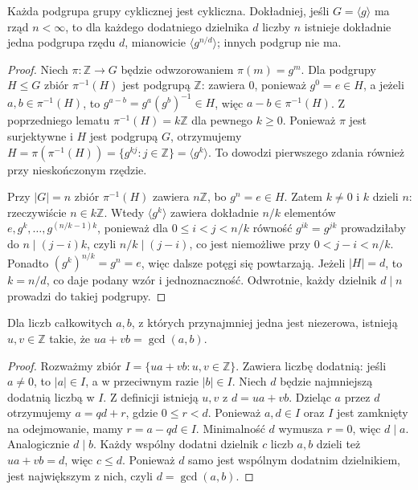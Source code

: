 \begin{twierdzenie}
\label{aa:tw:podgrupy-cykliczne}
Każda podgrupa grupy cyklicznej jest cykliczna.
Dokładniej, jeśli $G=\langle g\rangle$ ma rząd $n<\infty$,
to dla każdego dodatniego dzielnika $d$ liczby $n$ istnieje
dokładnie jedna podgrupa rzędu $d$, mianowicie
$\langle g^{n/d}\rangle$; innych podgrup nie ma.
\end{twierdzenie}
\begin{proof}
Niech $\pi:\mathbb Z\to G$ będzie odwzorowaniem
$\pi(m)=g^m$. Dla podgrupy $H\le G$ zbiór
$\pi^{-1}(H)$ jest podgrupą $\mathbb Z$:
zawiera $0$, ponieważ $g^0=e\in H$, a jeżeli
$a,b\in\pi^{-1}(H)$, to $g^{a-b}=g^a(g^b)^{-1}\in H$,
więc $a-b\in\pi^{-1}(H)$.
Z poprzedniego lematu $\pi^{-1}(H)=k\mathbb Z$ dla pewnego $k\ge0$.
Ponieważ $\pi$ jest surjektywne i $H$ jest podgrupą $G$,
otrzymujemy $H=\pi(\pi^{-1}(H))
=\{g^{kj}:j\in\mathbb Z\}=\langle g^k\rangle$.
To dowodzi pierwszego zdania również przy nieskończonym rzędzie.

Przy $|G|=n$ zbiór $\pi^{-1}(H)$ zawiera $n\mathbb Z$,
bo $g^n=e\in H$. Zatem $k\ne0$ i $k$ dzieli $n$:
rzeczywiście $n\in k\mathbb Z$.
Wtedy $\langle g^k\rangle$ zawiera dokładnie
$n/k$ elementów $e,g^k,\ldots,g^{(n/k-1)k}$,
ponieważ dla $0\le i<j<n/k$ równość $g^{ik}=g^{jk}$
prowadziłaby do $n\mid(j-i)k$, czyli $n/k\mid(j-i)$,
co jest niemożliwe przy $0<j-i<n/k$. Ponadto
$(g^k)^{n/k}=g^n=e$, więc dalsze potęgi się powtarzają.
Jeżeli $|H|=d$, to $k=n/d$, co daje podany wzór i jednoznaczność.
Odwrotnie, każdy dzielnik $d\mid n$ prowadzi do takiej podgrupy.
\end{proof}

\begin{lemat}
\label{aa:lem:bezout}
Dla liczb całkowitych $a,b$, z których przynajmniej jedna
jest niezerowa, istnieją $u,v\in\mathbb Z$ takie, że
$ua+vb=\gcd(a,b)$.
\end{lemat}
\begin{proof}
Rozważmy zbiór $I=\{ua+vb:u,v\in\mathbb Z\}$.
Zawiera liczbę dodatnią: jeśli $a\ne0$, to $|a|\in I$,
a w przeciwnym razie $|b|\in I$. Niech $d$ będzie najmniejszą
dodatnią liczbą w $I$. Z definicji istnieją $u,v$ z $d=ua+vb$.
Dzieląc $a$ przez $d$ otrzymujemy $a=qd+r$, gdzie $0\le r<d$.
Ponieważ $a,d\in I$ oraz $I$ jest zamknięty na odejmowanie,
mamy $r=a-qd\in I$. Minimalność $d$ wymusza $r=0$,
więc $d\mid a$. Analogicznie $d\mid b$.
Każdy wspólny dodatni dzielnik $c$ liczb $a,b$ dzieli też
$ua+vb=d$, więc $c\le d$. Ponieważ $d$ samo jest
wspólnym dodatnim dzielnikiem, jest największym z nich,
czyli $d=\gcd(a,b)$.
\end{proof}

